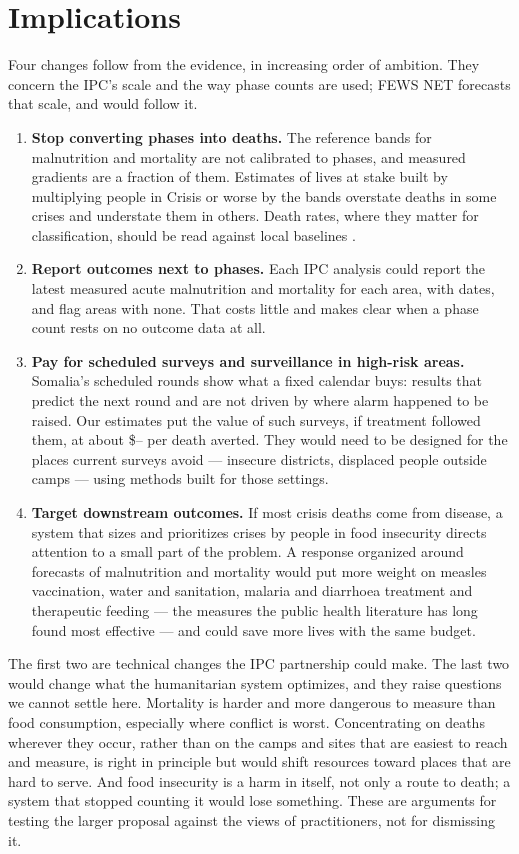 \documentclass[11pt]{article}
\begin{document}
\section{Implications}\label{sec:implications}

Four changes follow from the evidence, in increasing order of ambition. They concern the IPC's scale and the way phase counts are used; FEWS NET forecasts that scale, and would follow it.
\begin{enumerate}
  \item \textbf{Stop converting phases into deaths.} The reference bands for malnutrition and mortality are not calibrated to phases, and measured gradients are a fraction of them. Estimates of lives at stake built by multiplying people in Crisis or worse by the bands overstate deaths in some crises and understate them in others. Death rates, where they matter for classification, should be read against local baselines \citep{deZwarte2026Lancet}.
  \item \textbf{Report outcomes next to phases.} Each IPC analysis could report the latest measured acute malnutrition and mortality for each area, with dates, and flag areas with none. That costs little and makes clear when a phase count rests on no outcome data at all.
  \item \textbf{Pay for scheduled surveys and surveillance in high-risk areas.} Somalia's scheduled rounds show what a fixed calendar buys: results that predict the next round and are not driven by where alarm happened to be raised. Our estimates put the value of such surveys, if treatment followed them, at about \$\voiRangeLo{}--\voiRangeHi{} per death averted. They would need to be designed for the places current surveys avoid --- insecure districts, displaced people outside camps --- using methods built for those settings.
  \item \textbf{Target downstream outcomes.} If most crisis deaths come from disease, a system that sizes and prioritizes crises by people in food insecurity directs attention to a small part of the problem. A response organized around forecasts of malnutrition and mortality would put more weight on measles vaccination, water and sanitation, malaria and diarrhoea treatment and therapeutic feeding --- the measures the public health literature has long found most effective --- and could save more lives with the same budget.
\end{enumerate}

The first two are technical changes the IPC partnership could make. The last two would change what the humanitarian system optimizes, and they raise questions we cannot settle here. Mortality is harder and more dangerous to measure than food consumption, especially where conflict is worst. Concentrating on deaths wherever they occur, rather than on the camps and sites that are easiest to reach and measure, is right in principle but would shift resources toward places that are hard to serve. And food insecurity is a harm in itself, not only a route to death; a system that stopped counting it would lose something. These are arguments for testing the larger proposal against the views of practitioners, not for dismissing it.
\end{document}

